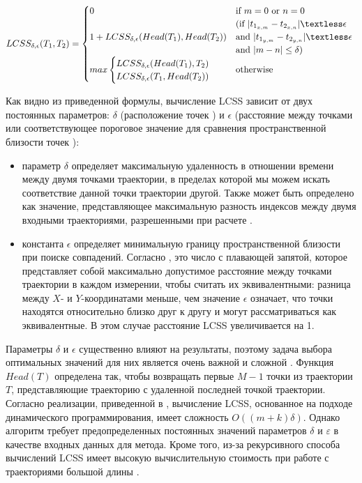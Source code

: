 \begin{equation} \label{eq:lcss}
	LCSS_{\delta, \epsilon}(T_1, T_2) = 
		\begin{cases}
			0 			&\text{if $m = 0$ or $n = 0$}\\
						&\text{(if $|t_{1_{x,m}} - t_{2_{x,n}}| \textless \epsilon$}\\
			1 + LCSS_{\delta, \epsilon}(Head(T_1), Head(T_2)) 
						&\text{and $|t_{1_{y,m}} - t_{2_{y,n}}| \textless \epsilon$ }\\
						&\text{and $|m - n| \le \delta$)}\\
			max
			\begin{cases}
				LCSS_{\delta, \epsilon}(Head(T_1), T_2)\\
				LCSS_{\delta, \epsilon}(T_1, Head(T_2))
			\end{cases} &\text{otherwise}
		\end{cases}
\end{equation}

Как видно из приведенной формулы, вычисление LCSS зависит от двух постоянных параметров: $\delta$ (расположение точек \cite{online:r_lcss}) и $\epsilon$ (расстояние между точками \cite{online:r_lcss} или соответствующее пороговое значение для сравнения пространственной близости точек \cite{article:tr_sim_meas}):
 
\begin{itemize}
	\item параметр $\delta$ определяет максимальную удаленность в отношении времени между двумя точками траектории, в пределах которой мы можем искать соответствие данной точки траектории другой. Также может быть определено как значение, представляющее максимальную разность индексов между двумя входными траекториями, разрешенными при расчете \cite{online:r_lcss}.
	\item константа $\epsilon$ определяет минимальную границу пространственной близости при поиске совпадений. Согласно \cite{online:r_lcss}, это число с плавающей запятой, которое представляет собой максимально допустимое расстояние между точками траектории в каждом измерении, чтобы считать их эквивалентными: разница между $X$- и $Y$-координатами меньше, чем значение $\epsilon$ означает, что точки находятся относительно близко друг к другу и могут рассматриваться как эквивалентные. В этом случае расстояние LCSS увеличивается на 1.
\end{itemize}

Параметры $\delta$ и $\epsilon$ существенно влияют на результаты, поэтому задача выбора оптимальных значений для них является очень важной и сложной \cite{inproceedings:7_related_work}\cite{inproceedings:28_lcss_dsmt}. Функция $Head(T)$ определена так, чтобы возвращать первые $M - 1$ точки из траектории $T$, представляющие траекторию с удаленной последней точкой траектории. Согласно реализации, приведенной в \cite{online:r_lcss}, вычисление LCSS, основанное на подходе динамического программирования, имеет сложность $O((m + k)\delta)$. Однако алгоритм требует предопределенных постоянных значений параметров $\delta$ и $\varepsilon$ в качестве входных данных для метода. Кроме того, из-за рекурсивного способа вычислений LCSS имеет высокую вычислительную стоимость при работе с траекториями большой длины \cite{inproceedings:comp_sim_meas_trcl}.

